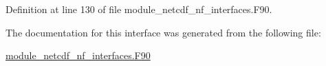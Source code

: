 Definition at line 130 of file module\+\_\+netcdf\+\_\+nf\+\_\+interfaces.\+F90.



The documentation for this interface was generated from the following file\+:\begin{DoxyCompactItemize}
\item 
\hyperlink{module__netcdf__nf__interfaces_8F90}{module\+\_\+netcdf\+\_\+nf\+\_\+interfaces.\+F90}\end{DoxyCompactItemize}

